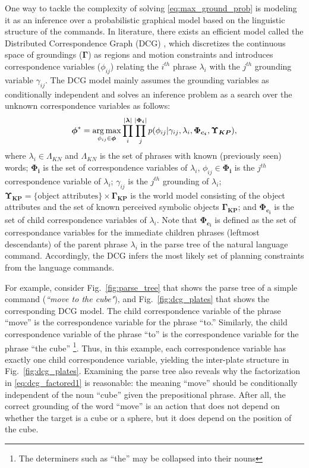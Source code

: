 One way to tackle the complexity of solving \eqref{eq:max_ground_prob} is modeling it as an inference over a probabilistic graphical model based on the linguistic structure of the commands. In literature, there exists an efficient model called the Distributed Correspondence Graph (DCG) \cite{dcg}, which discretizes the continuous space of groundings ($\boldsymbol\Gamma$) as regions and motion constraints and introduces correspondence variables ($\phi_{ij}$) relating the $i^{th}$ phrase $\lambda_i$ with the $j^{th}$ grounding variable $\gamma_{ij}$. The DCG model mainly assumes the grounding variables as conditionally independent and solves an inference problem as a search over the unknown correspondence variables as follows: 
\begin{equation}
\label{eq:dcg_factored1}
\begin{split}
\boldsymbol{\phi}^* = \operatorname*{\arg\max}_{\phi_{ij} \in \boldsymbol{\phi}} \prod_{i}^{| \boldsymbol{\lambda}|} \prod_{j}^{|\boldsymbol{\Phi_i}|} p(\phi_{ij}|\gamma_{ij},\lambda_i,\boldsymbol{\Phi_{c_{i}}} , \boldsymbol{\Upsilon_{KP}}),
\end{split}
\end{equation}
where $\lambda_i \in \Lambda_{KN}$ and $\Lambda_{KN}$ is the set of phrases with known (previously seen) words; $\boldsymbol{\Phi_i}$ is the set of correspondence variables of $\lambda_i$, $\phi_{ij} \in \boldsymbol{\Phi_i}$ is the $j^{th}$ correspondence variable of $\lambda_i$; $\gamma_{ij}$ is the $j^{th}$ grounding of $\lambda_i$; ${\boldsymbol{\Upsilon_{KP}} = \{\text{object attributes}\} \times \boldsymbol{\Gamma_{KP}}}$ is the world model consisting of the object attributes and the set of known perceived symbolic objects $\boldsymbol{\Gamma_{KP}}$; and  $\boldsymbol{\Phi_{c_{i}}}$ is the set of child correspondence variables of $\lambda_{i}$. Note that $\boldsymbol{\Phi_{c_{i}}}$ is defined as the set of correspondance variables for the immediate children phrases (leftmost descendants) of the parent phrase $\lambda_i$ in the parse tree of the natural language command. Accordingly, the DCG infers the most likely set of planning constraints from the language commands.

For example, consider Fig.~\ref{fig:parse_tree} that shows the parse tree of a simple command (\emph{``move to the cube"}), and Fig.~\ref{fig:dcg_plates} that shows the corresponding DCG model. The child correspondence variable of the phrase ``move'' is the correspondence variable for the phrase ``to.'' Similarly, the child correspondence variable of the phrase ``to'' is the correspondence variable for the phrase ``the cube'' \footnote{The determiners such as ``the'' may be collapsed into their nouns}. Thus, in this example, each correspondence variable has exactly one child correspondence variable, yielding the inter-plate structure in Fig.~\ref{fig:dcg_plates}.
Examining the parse tree also reveals why the factorization in \eqref{eq:dcg_factored1} is reasonable: the meaning ``move'' should be conditionally independent of the noun ``cube'' given the prepositional phrase.
After all, the correct grounding of the word ``move'' is an action that does not depend on whether the target is a cube or a sphere, but it does depend on the position of the cube.

